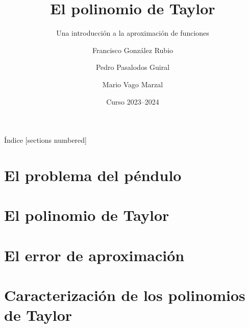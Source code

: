 \documentclass{beamer}
\title{El polinomio de Taylor}
\subtitle{Una introducción a la aproximación de funciones}
\author{Francisco González Rubio \and Pedro Pasalodos Guiral \and Mario Vago Marzal}
\date{Curso 2023--2024}
\institute{Universitat de València}
\begin{document}
  {
    \vfuzz=16pt
    \maketitle
  }

  \begin{frame}{Índice}
    [sections numbered]
    \tableofcontents
  \end{frame}

  \section{El problema del péndulo}
    
    

  \section{El polinomio de Taylor}
    
    
    
  \section{El error de aproximación}
    
    

  \section{Caracterización de los polinomios de Taylor}
    
    
    
    
\end{document}

